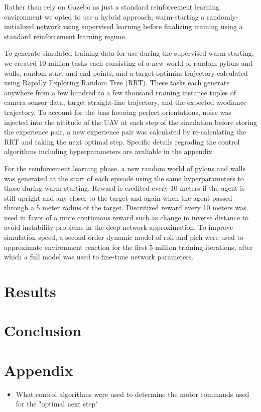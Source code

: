 \documentclass[paper=a4, fontsize=11pt]{scrartcl} %
\begin{document}
	Rather than rely on Gazebo as just a standard reinforcement learning environment we opted to use a hybrid approach; warm-starting a randomly-initialized network using supervised learning before finalizing training using a standard reinforcement learning regime. 

	To generate simulated training data for use during the supervised warm-starting, we created 10 million tasks each consisting of a new world of random pylons and walls, random start and end points, and a target optimim trajectory calculated using Rapidly Exploring Random Tree (RRT). These tasks each generate anywhere from a few hundred to a few thousand training instance tuples of camera sensor data, target straight-line trajectory, and the expected avodiance trajectory. To account for the bias favoring perfect orientations, noise was injected into the attitude of the UAV at each step of the simulation before storing the experience pair, a new experience pair was calculated by re-calculating the RRT and taking the next optimal step. Specific details regrading the control algorithms including hyperparameters are avaliable in the appendix.

	For the reinforcement learning phase, a new random world of pylons and walls was generated at the start of each episode using the same hyperparameters to those during warm-starting. Reward is credited every 10 meters if the agent is still upright and any closer to the target and again when the agent passed through a 5 meter radius of the target. Discritized reward every 10 meters was used in favor of a more continuous reward such as change in inverse distance to avoid instability problems in the deep network approximation. To improve simulation speed, a second-order dynamic model of roll and pich were used to approximate environment reaction for the first 5 million training iterations, after which a full model was used to fine-tune network parameters.


\section{Results}


\section{Conclusion}


\section{Appendix}


	\begin{itemize}
		\item What control algorithms were used to determine the motor commands used for the "optimal next step"
	\end{itemize}




\end{document}

